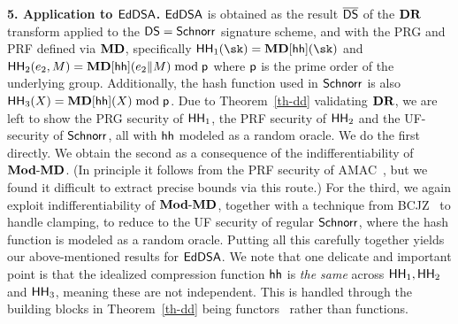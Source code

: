 \smallskip
\textbf{5. Application to $\mathsf{EdDSA}$.} $\mathsf{EdDSA}$ is obtained as the result $\overline{\mathsf{DS}}$ of the $\mathbf{DR}$ transform applied to the $\mathsf{DS}=\mathsf{Schnorr}$ signature scheme, and with the PRG and PRF defined via $\mathbf{MD}$, specifically $\HH_1(\sk) = \MD[\hh](\sk)$ and $\mathsf{HH}_2(e_2,M) = \mathbf{MD}[\mathsf{hh}](e_2\|M)\bmod\mathsf{p}$ where $\mathsf{p}$ is the prime order of the underlying group. Additionally, the hash function used in $\mathsf{Schnorr}$ is also $\mathsf{HH}_3(X) = \mathbf{MD}[\mathsf{hh}](X)\bmod\mathsf{p}$. Due to Theorem~\ref{th-dd} validating $\mathbf{DR}$, we are left to show the PRG security of $\mathsf{HH}_1$, the PRF security of $\mathsf{HH}_2$ and the UF-security of $\mathsf{Schnorr}$, all with $\mathsf{hh}$ modeled as a random oracle. We do the first directly. We obtain the second as a consequence of the indifferentiability of $\mathbf{Mod\mbox{-}MD}$. (In principle it follows from the PRF security of AMAC~\cite{EC:BelBerTes16}, but we found it difficult to extract precise bounds via this route.) For the third, we again exploit indifferentiability of $\mathbf{Mod\mbox{-}MD}$, together with a technique from BCJZ~\cite{SP:BCJZ21} to handle clamping, to reduce to the UF security of regular $\mathsf{Schnorr}$, where the hash function is modeled as a random oracle. Putting all this carefully together yields our above-mentioned results for $\mathsf{EdDSA}$. We note that one delicate and important point is that the idealized compression function $\mathsf{hh}$ is \textit{the same} across $\mathsf{HH}_1,\mathsf{HH}_2$ and $\mathsf{HH}_3$, meaning these are not independent. This is handled through the building blocks in Theorem~\ref{th-dd} being functors~\cite{EC:BelDavGun20} rather than functions.




